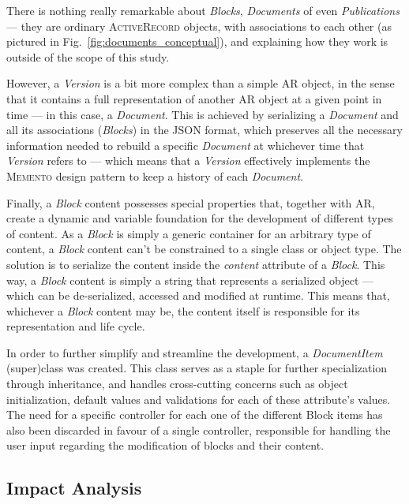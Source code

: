 There is nothing really remarkable about \emph{Blocks}, \emph{Documents} of even \emph{Publications} --- they are ordinary \textsc{ActiveRecord} objects, with associations to each other (as pictured in Fig.~\ref{fig:documents_conceptual}), and explaining how they work is outside of the scope of this study.

However, a \emph{Version} is a bit more complex than a simple AR object, in the sense that it contains a full representation of another AR object at a given point in time --- in this case, a \emph{Document}. This is achieved by serializing a \emph{Document} and all its associations (\emph{Blocks}) in the JSON format, which preserves all the necessary information needed to rebuild a specific \emph{Document} at whichever time that \emph{Version} refers to --- which means that a \emph{Version} effectively implements the \textsc{Memento} design pattern to keep a history of each \emph{Document}.

Finally, a \emph{Block} content possesses special properties that, together with AR, create a dynamic and variable foundation for the development of different types of content. As a \emph{Block} is simply a generic container for an arbitrary type of content, a \emph{Block} content can't be constrained to a single class or object type. The solution is to serialize the content inside the \emph{content} attribute of a \emph{Block}. This way, a \emph{Block} content is simply a string that represents a serialized object --- which can be de-serialized, accessed and modified at runtime. This means that, whichever a \emph{Block} content may be, the content itself is responsible for its representation and life cycle.

In order to further simplify and streamline the development, a \emph{DocumentItem} (super)class was created. This class serves as a staple for further specialization through inheritance, and handles cross-cutting concerns such as object initialization, default values and validations for each of these attribute's values. The need for a specific controller for each one of the different Block items has also been discarded in favour of a single controller, responsible for handling the user input regarding the modification of blocks and their content.

\subsection{Impact Analysis}\label{sec:fa_documents_impact_analysis}

